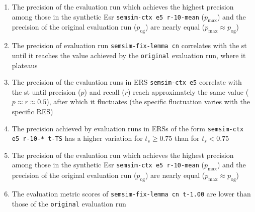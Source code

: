 \documentclass[11pt]{scrreprt}
\newcounter{listcounter}
\begin{document}
{\begin{enumerate}[label=\arabic{listcounter}.\arabic*]
	\item The precision of the evaluation run which achieves the highest precision among those in the synthetic E\gls{sr} \texttt{semsim-ctx e5 r-10-mean} (\(p_\text{max}\)) and the precision of the original evaluation run (\(p_\text{og}\)) are nearly equal (\(p_\text{max} \approx p_\text{og}\)) \label{obs-itm:cness-highest-precision-equal-original} 	
	\item The precision of evaluation run \texttt{semsim-fix-lemma cn}  correlates with the \gls{st} until it reaches the value achieved by the \texttt{original} evaluation run, where it plateaus \label{obs-itm:fness-st-precision-correlates}
	\item The precision of the evaluation runs in ERS \texttt{semsim-ctx e5} correlate with the \gls{st} until precision (\(p\)) and recall (\(r\)) reach approximately the same value (\(p \approx r \approx 0.5\)), after which it fluctuates (the specific fluctuation varies with the specific RES) \label{obs-itm:cness-st-precision-correlates-until-crosspoint}

	\item The precision achieved by evaluation runs in ERSs of the form \texttt{semsim-ctx e5 r-10-* t-TS} has a higher variation for \(t_s \geq 0.75\) than for \(t_s < 0.75\) \label{obs-itm:cness-precision-variation-higher-ASTR}
	\item The precision of the evaluation run which achieves the highest precision among those in the synthetic E\gls{sr} \texttt{semsim-ctx e5 r-10-mean} (\(p_\text{max}\)) and the precision of the original evaluation run (\(p_\text{og}\)) are nearly equal (\(p_\text{max} \approx p_\text{og}\)) \label{obs-itm:cness-highest-precision-equal-original} 	
	\item The evaluation metric scores of \texttt{semsim-fix-lemma cn t-1.00} are lower than those of the \texttt{original} evaluation run \label{obs-itm:fness-st-limit}


\end{enumerate}
 
 
 
 
}
\end{document}
